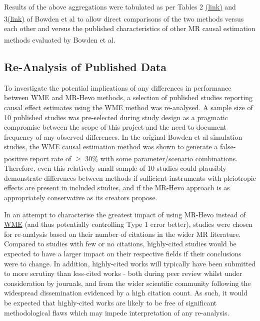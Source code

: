 \documentclass[
]{article}
\begin{document}
Results of the above aggregations were tabulated as per Tables 2 \href{https://pmc.ncbi.nlm.nih.gov/articles/PMC4849733/table/gepi21965-tbl-0002/}{(link)} and 3\href{https://pmc.ncbi.nlm.nih.gov/articles/PMC4849733/table/gepi21965-tbl-0003/}{(link)} of Bowden et al\textsuperscript{} to allow direct comparisons of the two methods versus each other and versus the published characteristics of other MR causal estimation methods evaluated by Bowden et al\textsuperscript{}.

\subsection{Re-Analysis of Published Data}\label{re-analysis-of-published-data}

To investigate the potential implications of any differences in performance between WME and MR-Hevo methods, a selection of published studies reporting causal effect estimates using the WME method was re-analysed. A sample size of 10 published studies was pre-selected during study design as a pragmatic compromise between the scope of this project and the need to document frequency of any observed differences. In the original Bowden et al simulation studies, the WME causal estimation method was shown to generate a false-positive report rate of \(\ge\) 30\% with some parameter/scenario combinations\textsuperscript{}. Therefore, even this relatively small sample of 10 studies could plausibly demonstrate differences between methods if sufficient instruments with pleiotropic effects are present in included studies, and if the MR-Hevo approach is as appropriately conservative as its creators propose.

In an attempt to characterise the greatest impact of using MR-Hevo instead of \hyperref[acronyms_WME]{WME} (and thus potentially controlling Type 1 error better), studies were chosen for re-analysis based on their number of citations in the wider MR literature. Compared to studies with few or no citations, highly-cited studies would be expected to have a larger impact on their respective fields if their conclusions were to change. In addition, highly-cited works will typically have been submitted to more scrutiny than less-cited works - both during peer review whilst under consideration by journals, and from the wider scientific community following the widespread dissemination evidenced by a high citation count. As such, it would be expected that highly-cited works are likely to be free of significant methodological flaws which may impede interpretation of any re-analysis.
\end{document}
